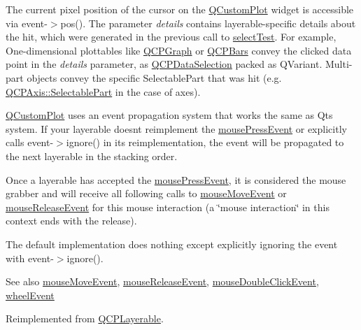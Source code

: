 The current pixel position of the cursor on the \hyperlink{class_q_custom_plot}{Q\+Custom\+Plot} widget is accessible via {\ttfamily event-\/$>$pos()}. The parameter {\itshape details} contains layerable-\/specific details about the hit, which were generated in the previous call to \hyperlink{class_q_c_p_axis_a63b7103c57fe9acfbce164334ea837f8}{select\+Test}. For example, One-\/dimensional plottables like \hyperlink{class_q_c_p_graph}{Q\+C\+P\+Graph} or \hyperlink{class_q_c_p_bars}{Q\+C\+P\+Bars} convey the clicked data point in the {\itshape details} parameter, as \hyperlink{class_q_c_p_data_selection}{Q\+C\+P\+Data\+Selection} packed as Q\+Variant. Multi-\/part objects convey the specific {\ttfamily Selectable\+Part} that was hit (e.\+g. \hyperlink{class_q_c_p_axis_abee4c7a54c468b1385dfce2c898b115f}{Q\+C\+P\+Axis\+::\+Selectable\+Part} in the case of axes).

\hyperlink{class_q_custom_plot}{Q\+Custom\+Plot} uses an event propagation system that works the same as Qt\textquotesingle{}s system. If your layerable doesn\textquotesingle{}t reimplement the \hyperlink{class_q_c_p_axis_ac89c068873ee9197a5d2af715bdc1105}{mouse\+Press\+Event} or explicitly calls {\ttfamily event-\/$>$ignore()} in its reimplementation, the event will be propagated to the next layerable in the stacking order.

Once a layerable has accepted the \hyperlink{class_q_c_p_axis_ac89c068873ee9197a5d2af715bdc1105}{mouse\+Press\+Event}, it is considered the mouse grabber and will receive all following calls to \hyperlink{class_q_c_p_axis_a2a89a13440eec099fc2327c2672be0cd}{mouse\+Move\+Event} or \hyperlink{class_q_c_p_axis_a35663b938ad83e91c0b8e59dbc8c6b18}{mouse\+Release\+Event} for this mouse interaction (a \char`\"{}mouse interaction\char`\"{} in this context ends with the release).

The default implementation does nothing except explicitly ignoring the event with {\ttfamily event-\/$>$ignore()}.

\begin{DoxySeeAlso}{See also}
\hyperlink{class_q_c_p_axis_a2a89a13440eec099fc2327c2672be0cd}{mouse\+Move\+Event}, \hyperlink{class_q_c_p_axis_a35663b938ad83e91c0b8e59dbc8c6b18}{mouse\+Release\+Event}, \hyperlink{class_q_c_p_layerable_a4171e2e823aca242dd0279f00ed2de81}{mouse\+Double\+Click\+Event}, \hyperlink{class_q_c_p_axis_a71643d27524a843230b5ba68085b3d9b}{wheel\+Event} 
\end{DoxySeeAlso}


Reimplemented from \hyperlink{class_q_c_p_layerable_af6567604818db90f4fd52822f8bc8376}{Q\+C\+P\+Layerable}.

